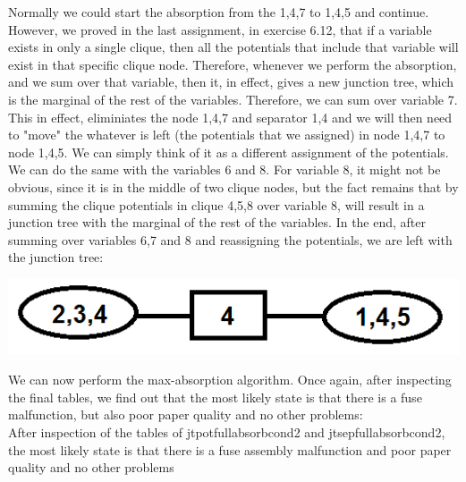 \documentclass[11pt,a4paper,oneside]{report}
\begin{document}
Normally we could start the absorption from the 1,4,7 to 1,4,5 and continue. However, we proved in the last assignment, in exercise 6.12, that if a variable exists in only a single clique, then all the potentials that include that variable will exist in that specific clique node. Therefore, whenever we perform the absorption, and we sum over that variable, then it, in effect, gives a new junction tree, which is the marginal of the rest of the variables. Therefore, we can sum over variable 7. This in effect, eliminiates the node 1,4,7 and separator 1,4 and we will then need to "move" the whatever is left (the potentials that we assigned) in node 1,4,7 to node 1,4,5. We can simply think of it as a different assignment of the potentials. We can do the same with the variables 6 and 8. For variable 8, it might not be obvious, since it is in the middle of two clique nodes, but the fact remains that by summing the clique potentials in clique 4,5,8 over variable 8, will result in a junction tree with the marginal of 
the rest of the variables. In the end, after summing over variables 6,7 and 8 and reassigning the potentials, we are left with the junction tree:\\

	\begin{center} \includegraphics[width=1\textwidth]{c9e1junctiontreefinal}\end{center}
	
	We can now perform the max-absorption algorithm. Once again, after inspecting the final tables, we find out that the most likely state is that there is a fuse malfunction, but also poor paper quality and no other problems:\\

After inspection of the tables of jtpotfullabsorbcond2 and jtsepfullabsorbcond2, the most likely state is that there is a fuse assembly malfunction and poor paper quality and no other problems\\\\
\end{document}
